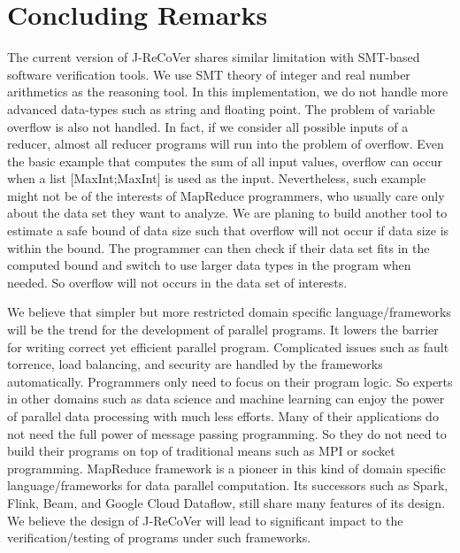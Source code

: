 \documentclass{llncs}
\begin{document}
\section{Concluding Remarks}

The current version of J-ReCoVer shares similar limitation with SMT-based software verification tools.
We use SMT theory of integer and real number arithmetics as the reasoning tool. In this implementation, we do not handle more advanced data-types such as string and floating point. The problem of variable overflow is also not handled. In fact, if we consider all possible inputs of a reducer, almost all reducer programs will run into the problem of overflow. Even the basic example that computes the sum of all input values, overflow can occur when a list [\textsf{MaxInt};\textsf{MaxInt}] is used as the input. Nevertheless, such example might not be of the interests of MapReduce programmers, who usually care only about the data set they want to analyze. We are planing to build another tool to estimate a safe bound of data size such that overflow will not occur if data size is within the bound. The programmer can then check if their data set fits in the computed bound and switch to use larger data types in the program when needed. So overflow will not occurs in the data set of interests.

We believe that simpler but more restricted domain specific language/frameworks will be the trend for the development of parallel programs. It lowers the barrier for writing correct yet efficient parallel program. Complicated issues such as fault torrence, load balancing, and security are handled by the frameworks automatically. Programmers only need to focus on their program logic. So experts in other domains such as data science and machine learning can enjoy the power of parallel data processing with much less efforts. Many of their applications do not need the full power of message passing programming. So they do not need to build their programs on top of traditional means such as MPI or socket programming. MapReduce framework is a pioneer in this kind of domain specific language/frameworks for data parallel computation. Its successors such as Spark, Flink, Beam, and Google Cloud Dataflow, still share many features of its design. We believe the design of J-ReCoVer will lead to significant impact to the verification/testing of programs under such frameworks.





\end{document}
